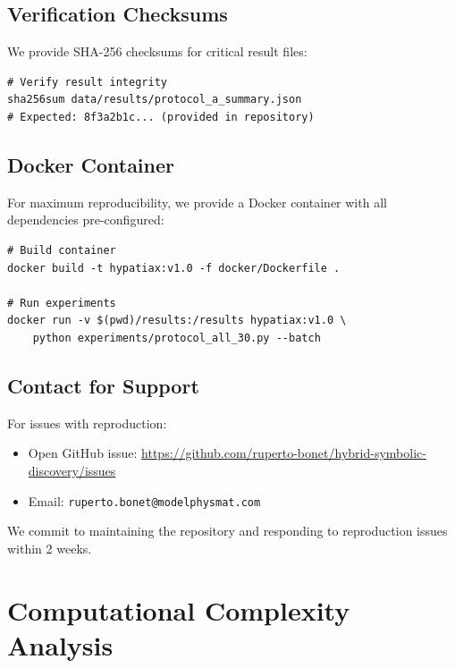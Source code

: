 \subsection{Verification Checksums}

We provide SHA-256 checksums for critical result files:

\begin{small}
\begin{verbatim}
# Verify result integrity
sha256sum data/results/protocol_a_summary.json
# Expected: 8f3a2b1c... (provided in repository)
\end{verbatim}
\end{small}

\subsection{Docker Container}

For maximum reproducibility, we provide a Docker container with all dependencies pre-configured:

\begin{small}
\begin{verbatim}
# Build container
docker build -t hypatiax:v1.0 -f docker/Dockerfile .

# Run experiments
docker run -v $(pwd)/results:/results hypatiax:v1.0 \
    python experiments/protocol_all_30.py --batch
\end{verbatim}
\end{small}

\subsection{Contact for Support}

For issues with reproduction:
\begin{itemize}
\item Open GitHub issue: \url{https://github.com/ruperto-bonet/hybrid-symbolic-discovery/issues}
\item Email: \texttt{ruperto.bonet@modelphysmat.com}
\end{itemize}

We commit to maintaining the repository and responding to reproduction issues within 2 weeks.


\section{Computational Complexity Analysis}
\label{app:complexity}

